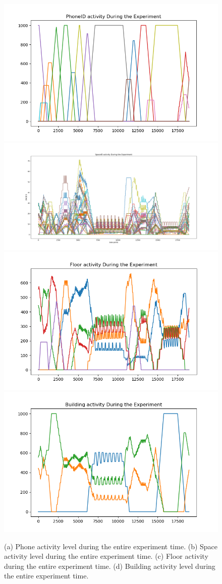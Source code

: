 \documentclass[../UNBThesis2.tex]{subfiles}
\begin{document}
\begin{figure}
    \centering
        \includegraphics[width = 7 cm]{image/Chapters/Chapter6/phoneTime.png}\hfill
        \includegraphics[width = 7 cm]{image/Chapters/Chapter6/spaceidAccumulat.png}\hfill
        \includegraphics[width = 7 cm]{image/Chapters/Chapter6/floorTime.png}\hfill
        \includegraphics[width = 7 cm]{image/Chapters/Chapter6/buildingTime.png}
    \caption{(a) Phone activity level during the entire experiment time. (b) Space activity level during the entire experiment time. (c) Floor activity during the entire experiment time. (d) Building activity level during the entire experiment time.}
    \label{alltogether}
\end{figure}




\end{document}
